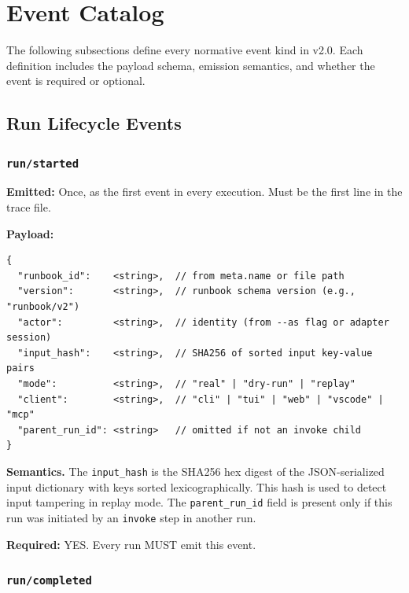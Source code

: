 \section{Event Catalog}
\label{sec:event-catalog}

The following subsections define every normative event kind in v2.0. Each definition includes the payload schema, emission semantics, and whether the event is required or optional.

\subsection{Run Lifecycle Events}

\subsubsection{\texttt{run/started}}

\textbf{Emitted:} Once, as the first event in every execution. Must be the first line in the trace file.

\textbf{Payload:}
\begin{verbatim}
{
  "runbook_id":    <string>,  // from meta.name or file path
  "version":       <string>,  // runbook schema version (e.g., "runbook/v2")
  "actor":         <string>,  // identity (from --as flag or adapter session)
  "input_hash":    <string>,  // SHA256 of sorted input key-value pairs
  "mode":          <string>,  // "real" | "dry-run" | "replay"
  "client":        <string>,  // "cli" | "tui" | "web" | "vscode" | "mcp"
  "parent_run_id": <string>   // omitted if not an invoke child
}
\end{verbatim}

\textbf{Semantics.} The \texttt{input\_hash} is the SHA256 hex digest of the JSON-serialized input dictionary with keys sorted lexicographically. This hash is used to detect input tampering in replay mode. The \texttt{parent\_run\_id} field is present only if this run was initiated by an \texttt{invoke} step in another run.

\textbf{Required:} YES. Every run MUST emit this event.


\subsubsection{\texttt{run/completed}}

